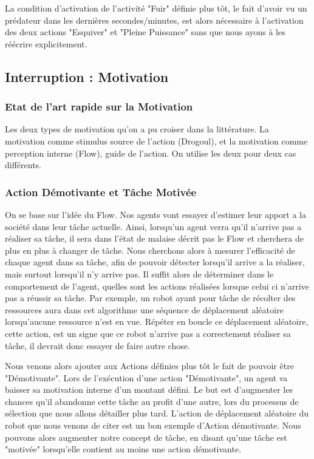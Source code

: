 \documentclass[11pt,a4paper]{article}
\begin{document}
			La condition d'activation de l'activité "Fuir" définie plus tôt, le fait d'avoir vu un prédateur dans les dernières secondes/minutes, est alors nécessaire à l'activation des deux actions "Esquiver" et "Pleine Puissance" sans que nous ayons à les réécrire explicitement.
	
	\subsection{Interruption : Motivation}
		\subsubsection{Etat de l'art rapide sur la Motivation}
			Les deux types de motivation qu'on a pu croiser dans la littérature. La motivation comme stimulus source de l'action (Drogoul), et la motivation comme perception interne (Flow), guide de l'action. On utilise les deux pour deux cas différents.
		\subsubsection{Action Démotivante et Tâche Motivée}
			On se base sur l'idée du Flow. Nos agents vont essayer d'estimer leur apport a la société dans leur tâche actuelle. Ainsi, lorsqu'un agent verra qu'il n'arrive pas a réaliser sa tâche, il sera dans l'état de malaise décrit pas le Flow et cherchera de plus en plus à changer de tâche. Nous cherchons alors à mesurer l'efficacité de chaque agent dans sa tâche, afin de pouvoir détecter lorsqu'il arrive a la réaliser, mais surtout lorsqu'il n'y arrive pas. Il suffit alors de déterminer dans le comportement de l'agent, quelles sont les actions réalisées lorsque celui ci n'arrive pas a réussir sa tâche. Par exemple, un robot ayant pour tâche de récolter des ressources aura dans cet algorithme une séquence de déplacement aléatoire lorsqu'aucune ressource n'est en vue. Répéter en boucle ce déplacement aléatoire, cette action, est un signe que ce robot n'arrive pas a correctement réaliser sa tâche, il devrait donc essayer de faire autre chose.
			
			Nous venons alors ajouter aux Actions définies plus tôt le fait de pouvoir être "Démotivante". Lors de l'exécution d'une action "Démotivante", un agent va baisser sa motivation interne d'un montant défini. Le but est d'augmenter les chances qu'il abandonne cette tâche au profit d'une autre, lors du processus de sélection que nous allons détailler plus tard. L'action de déplacement aléatoire du robot que nous venons de citer est un bon exemple d'Action démotivante. Nous pouvons alors augmenter notre concept de tâche, en disant qu'une tâche est "motivée" lorsqu'elle contient au moins une action démotivante.
			
\end{document}
